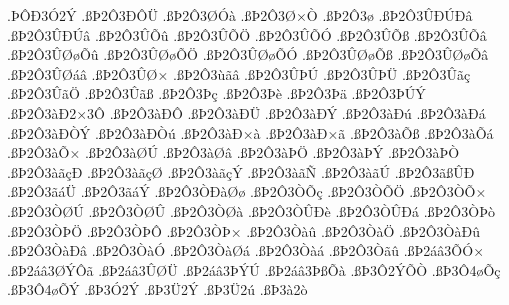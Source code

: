 {.^^de^^d4^^d03^^d32^^dd
.^^df^^de2^^d43^^d0^^d4^^dc
.^^df^^de2^^d43^^d8^^d3^^e0
.^^df^^de2^^d43^^d8^^d7^^d2
.^^df^^de2^^d43^^f8
.^^df^^de2^^d43^^db^^d0^^da^^d0^^e2
.^^df^^de2^^d43^^db^^d0^^da^^e2
.^^df^^de2^^d43^^db^^d5^^fb
.^^df^^de2^^d43^^db^^d5^^d6
.^^df^^de2^^d43^^db^^d5^^d3
.^^df^^de2^^d43^^db^^d5^^df
.^^df^^de2^^d43^^db^^d5^^e2
.^^df^^de2^^d43^^db^^d8^^f8^^d5^^fb
.^^df^^de2^^d43^^db^^d8^^f8^^d5^^d6
.^^df^^de2^^d43^^db^^d8^^f8^^d5^^d3
.^^df^^de2^^d43^^db^^d8^^f8^^d5^^df
.^^df^^de2^^d43^^db^^d8^^f8^^d5^^e2
.^^df^^de2^^d43^^db^^d8^^e1^^e2
.^^df^^de2^^d43^^db^^d8^^d7
.^^df^^de2^^d43^^f9^^e3^^e2
.^^df^^de2^^d43^^db^^de^^da
.^^df^^de2^^d43^^db^^de^^dc
.^^df^^de2^^d43^^db^^e3^^e7
.^^df^^de2^^d43^^db^^e3^^d6
.^^df^^de2^^d43^^db^^e3^^df
.^^df^^de2^^d43^^de^^e7
.^^df^^de2^^d43^^de^^e8
.^^df^^de2^^d43^^de^^e4
.^^df^^de2^^d43^^de^^da^^dd
.^^df^^de2^^d43^^e0^^d02^^d73^^d4
.^^df^^de2^^d43^^e0^^d0^^d4
.^^df^^de2^^d43^^e0^^d0^^dc
.^^df^^de2^^d43^^e0^^d0^^dd
.^^df^^de2^^d43^^e0^^d0^^fa
.^^df^^de2^^d43^^e0^^d0^^e1
.^^df^^de2^^d43^^e0^^d0^^d2^^dd
.^^df^^de2^^d43^^e0^^d0^^d2^^fa
.^^df^^de2^^d43^^e0^^d0^^d7^^e0
.^^df^^de2^^d43^^e0^^d0^^d7^^e3
.^^df^^de2^^d43^^e0^^d5^^df
.^^df^^de2^^d43^^e0^^d5^^e1
.^^df^^de2^^d43^^e0^^d5^^d7
.^^df^^de2^^d43^^e0^^d8^^da
.^^df^^de2^^d43^^e0^^d8^^e2
.^^df^^de2^^d43^^e0^^de^^d6
.^^df^^de2^^d43^^e0^^de^^dd
.^^df^^de2^^d43^^e0^^de^^d2
.^^df^^de2^^d43^^e0^^e3^^e7^^d0
.^^df^^de2^^d43^^e0^^e3^^e7^^d8
.^^df^^de2^^d43^^e0^^e3^^e7^^dd
.^^df^^de2^^d43^^e0^^e3^^d1
.^^df^^de2^^d43^^e0^^e3^^da
.^^df^^de2^^d43^^e3^^df^^db^^d0
.^^df^^de2^^d43^^e3^^e1^^dc
.^^df^^de2^^d43^^e3^^e1^^dd
.^^df^^de2^^d43^^d2^^d0^^e0^^d8^^f8
.^^df^^de2^^d43^^d2^^d5^^e7
.^^df^^de2^^d43^^d2^^d5^^d6
.^^df^^de2^^d43^^d2^^d5^^d7
.^^df^^de2^^d43^^d2^^d8^^da
.^^df^^de2^^d43^^d2^^d8^^db
.^^df^^de2^^d43^^d2^^d8^^e0
.^^df^^de2^^d43^^d2^^db^^d0^^e8
.^^df^^de2^^d43^^d2^^db^^d0^^e1
.^^df^^de2^^d43^^d2^^de^^f2
.^^df^^de2^^d43^^d2^^de^^d6
.^^df^^de2^^d43^^d2^^de^^d4
.^^df^^de2^^d43^^d2^^de^^d7
.^^df^^de2^^d43^^d2^^e0^^fb
.^^df^^de2^^d43^^d2^^e0^^d6
.^^df^^de2^^d43^^d2^^e0^^d0^^fb
.^^df^^de2^^d43^^d2^^e0^^d0^^e2
.^^df^^de2^^d43^^d2^^e0^^d3
.^^df^^de2^^d43^^d2^^e0^^d8^^e1
.^^df^^de2^^d43^^d2^^e0^^e1
.^^df^^de2^^d43^^d2^^e3^^fb
.^^df^^de2^^e1^^e23^^d5^^d3^^d7
.^^df^^de2^^e1^^e23^^d8^^dd^^d4^^e3
.^^df^^de2^^e1^^e23^^db^^d8^^dc
.^^df^^de2^^e1^^e23^^de^^dd^^da
.^^df^^de2^^e1^^e23^^de^^df^^d5^^e0
.^^df^^de3^^d42^^dd^^d5^^d2
.^^df^^de3^^d44^^f8^^d5^^e7
.^^df^^de3^^d44^^f8^^d5^^dd
.^^df^^de3^^d32^^dd
.^^df^^de3^^dc2^^dd
.^^df^^de3^^dc2^^fa
.^^df^^de3^^e02^^f2
}
